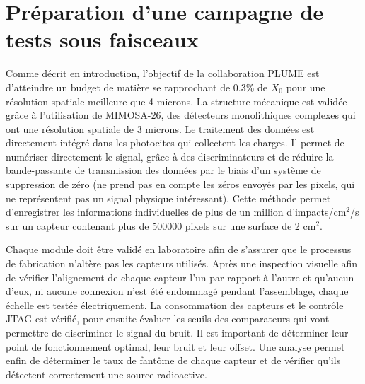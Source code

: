 \documentclass[a4papper, 10pt]{article}
\begin{document}
  \section{Préparation d'une campagne de tests sous faisceaux}

  Comme décrit en introduction, l'objectif de la collaboration PLUME est d'atteindre un budget de matière se rapprochant de 0.3\% de $X_0$ pour une résolution spatiale meilleure que 4 microns.
  La structure mécanique est validée grâce à l'utilisation de MIMOSA-26, des détecteurs monolithiques complexes qui ont une résolution spatiale de 3 microns.
  Le traitement des données est directement intégré dans les photocites qui collectent les charges. 
  Il permet de numériser directement le signal, grâce à des discriminateurs et de réduire la bande-passante de transmission des données par le biais d'un système de suppression de zéro (ne prend pas en compte les zéros envoyés par les pixels, qui ne représentent pas un signal physique intéressant).
  Cette méthode permet d'enregistrer les informations individuelles de plus de un million d'impacts/cm$^2$/s sur un capteur contenant plus de 500000 pixels sur une surface de 2 cm$^2$.

  Chaque module doit être validé en laboratoire afin de s'assurer que le processus de fabrication n'altère pas les capteurs utilisés.
  Après une inspection visuelle afin de vérifier l'alignement de chaque capteur l'un par rapport à l'autre et qu'aucun d'eux, ni aucune connexion n'est été endommagé pendant l'assemblage, chaque échelle est testée électriquement.
  La consommation des capteurs et le contrôle JTAG est vérifié, pour ensuite évaluer les seuils des comparateurs qui vont permettre de discriminer le signal du bruit.
  Il est important de déterminer leur point de fonctionnement optimal, leur bruit et leur offset. 
  Une analyse permet enfin de déterminer le taux de fantôme de chaque capteur et de vérifier qu'ils détectent correctement une source radioactive.
  
\end{document}
